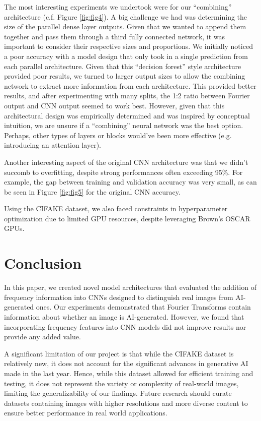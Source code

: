 The most interesting experiments we undertook were for our “combining” architecture (c.f. Figure \ref{fig:fig4}). A big challenge we had was determining the size of the parallel dense layer outputs. Given that we wanted to append them together and pass them through a third fully connected network, it was important to consider their respective sizes and proportions. We initially noticed a poor accuracy with a model design that only took in a single prediction from each parallel architecture. Given that this “decision forest” style architecture provided poor results, we turned to larger output sizes to allow the combining network to extract more information from each architecture. This provided better results, and after experimenting with many splits, the 1:2 ratio between Fourier output and CNN output seemed to work best. However, given that this architectural design was empirically determined and was inspired by conceptual intuition, we are unsure if a “combining” neural network was the best option. Perhaps, other types of layers or blocks would’ve been more effective (e.g. introducing an attention layer).

Another interesting aspect of the original CNN architecture was that we didn't succomb to overfitting, despite strong performances often exceeding 95\%. For example, the gap between training and validation accuracy was very small, as can be seen in Figure \ref{fig:fig5} for the original CNN accuracy.

Using the CIFAKE dataset, we also faced constraints in hyperparameter optimization due to limited GPU resources, despite leveraging Brown’s OSCAR GPUs. 


\section{Conclusion}

In this paper, we created novel model architectures that evaluated the addition of frequency information into CNNs designed to distinguish real images from AI-generated ones. Our experiments demonstrated that Fourier Transforms contain information about whether an image is AI-generated. However, we found that incorporating frequency features into CNN models did not improve results nor provide any added value. 

A significant limitation of our project is that while the CIFAKE dataset is relatively new, it does not account for the significant advances in generative AI made in the last year. Hence, while this dataset allowed for efficient training and testing, it does not represent the variety or complexity of real-world images, limiting the generalizability of our findings. Future research should curate datasets containing images with higher resolutions and more diverse content to ensure better performance in real world applications. 




